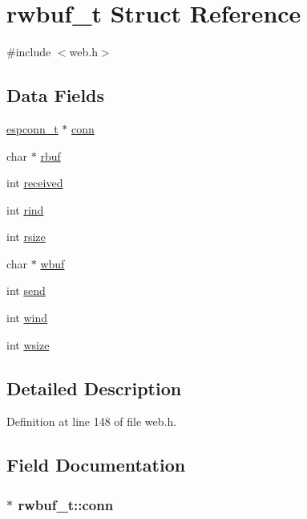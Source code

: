 \hypertarget{structrwbuf__t}{\section{rwbuf\-\_\-t Struct Reference}
\label{structrwbuf__t}
}


{\ttfamily \#include $<$web.\-h$>$}

\subsection*{Data Fields}
\begin{DoxyCompactItemize}
\item 
\hyperlink{web_8h_a6dae30cd245bde804cf3e2c09e39a4b6}{espconn\-\_\-t} $\ast$ \hyperlink{structrwbuf__t_a15785240e32c27f7af7c4b0cb1a6e39b}{conn}
\item 
char $\ast$ \hyperlink{structrwbuf__t_afd83372241273849c9395d587b146021}{rbuf}
\item 
int \hyperlink{structrwbuf__t_ac76412a0fbf9dc009ae3f8bb20660883}{received}
\item 
int \hyperlink{structrwbuf__t_ad5cbf7a78a5f5d9aa75b38f90e0fb6af}{rind}
\item 
int \hyperlink{structrwbuf__t_aa4094c7e329ae85cc50dbd06d3b50d44}{rsize}
\item 
char $\ast$ \hyperlink{structrwbuf__t_a68386231f3d907ec4508c090925782a2}{wbuf}
\item 
int \hyperlink{structrwbuf__t_a279490994b6576ad00900254a8c07a89}{send}
\item 
int \hyperlink{structrwbuf__t_a135345eee44e93f37e57dbabec12c339}{wind}
\item 
int \hyperlink{structrwbuf__t_ac723cf150dd35d0f67ba7d38b18863ad}{wsize}
\end{DoxyCompactItemize}


\subsection{Detailed Description}


Definition at line 148 of file web.\-h.



\subsection{Field Documentation}
\hypertarget{structrwbuf__t_a15785240e32c27f7af7c4b0cb1a6e39b}{
\subsubsection[{conn}]{$\ast$ rwbuf\-\_\-t\-::conn}}\label{structrwbuf__t_a15785240e32c27f7af7c4b0cb1a6e39b}


